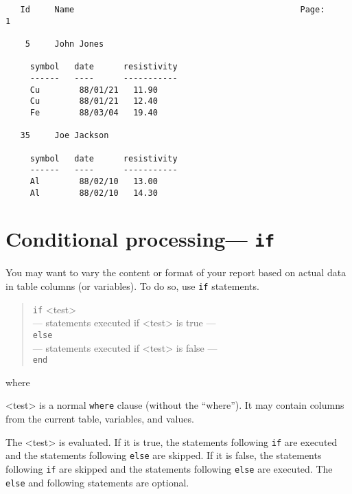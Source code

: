 \documentclass[11pt,a4paper]{report}
\begin{document}
\begin{verbatim}
   Id     Name                                              Page:     1
 
    5     John Jones
 
     symbol   date      resistivity
     ------   ----      -----------
     Cu        88/01/21   11.90
     Cu        88/01/21   12.40
     Fe        88/03/04   19.40
 
   35     Joe Jackson
 
     symbol   date      resistivity
     ------   ----      -----------
     Al        88/02/10   13.00
     Al        88/02/10   14.30
\end{verbatim}
 
 
 
\section{Conditional processing--- {\tt if}}
%
You may want to vary the content or format of your report
based on actual data in table columns (or variables).
To do so, use \verb!if! statements.
\begin{verse}
  \verb!if! <test>\\
  --- statements executed if <test> is true ---\\
  \verb!else!\\
  --- statements executed if <test> is false ---\\
  \verb!end! 
\end{verse}
where
\begin{List}
\item[<test>] is a normal \verb!where! clause (without the
``where'').  It may contain columns from the current table,
variables, and values.
\end{List}
 
The <test> is evaluated.
If it is true,
the statements following \verb!if! are executed and the statements
following \verb!else! are skipped.
If it is false,
the statements following \verb!if! are skipped and the statements
following \verb!else! are executed.
The \verb!else! and following statements are optional.
 
\end{document}
